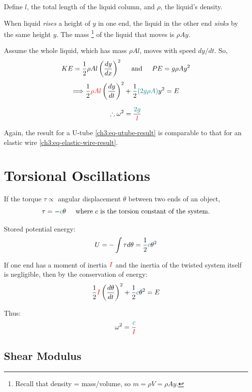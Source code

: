 Define $l$, the total length of the liquid column, and $\rho$, the liquid's density.

When liquid \textit{rises} a height of $y$ in one end, the liquid in the other end \textit{sinks} by the same height $y$. The mass%
\footnote{Recall that density = mass/volume, so $m=\rho V=\rho Ay$.}
of the liquid that moves is $\rho Ay$. 

Assume the whole liquid, which has mass $\rho Al$, moves with speed $dy/dt$. So,
\[ KE = \frac{1}{2} \rho Al \left(\frac{dy}{dx}\right)^2 \hspace{0.5cm}\text{and}\hspace{0.5cm}
PE = g\rho Ay^2 \]
\[ \Longrightarrow \frac{1}{2} \textcolor{red}{\rho Al} \left( \frac{dy}{dt} \right)^2 
+ \frac{1}{2} \textcolor{teal}{(2g\rho A)} y^2 = E  \] 

\begin{equation}
\therefore \omega^2 = \frac{\textcolor{teal}{2g}}{\textcolor{red}{l}} \label{ch3:eq-utube-result}
\end{equation}

Again, the result for a U-tube \eqref{ch3:eq-utube-result} is comparable to that for an elastic wire \eqref{ch3:eq-elastic-wire-result}.

\section{Torsional Oscillations} \label{ch3:sec-torsional}

If the torque $\tau \propto$ angular displacement $\theta$ between two ends of an object,
\[ \tau=-\textcolor{teal}{c}\theta \hspace{0.5cm}\text{where }\text{$c$ is the torsion constant of the system.} \]

Stored potential energy: \[ U= -\int \tau d\theta = \frac{1}{2} \textcolor{teal}{c}\theta^2 \]

If one end has a moment of inertia $\textcolor{red}{I}$ and the inertia of the twisted system itself is negligible, then by the conservation of energy:
\[ \frac{1}{2} \textcolor{red}{I} \left( \frac{d\theta}{dt}\right)^2 + \frac{1}{2} \textcolor{teal}{c}\theta^2 = E \]

Thus:
\begin{equation*}
\omega^2 = \frac{\textcolor{teal}{c}}{\textcolor{red}{I}}
\end{equation*}


\subsection{Shear Modulus}

